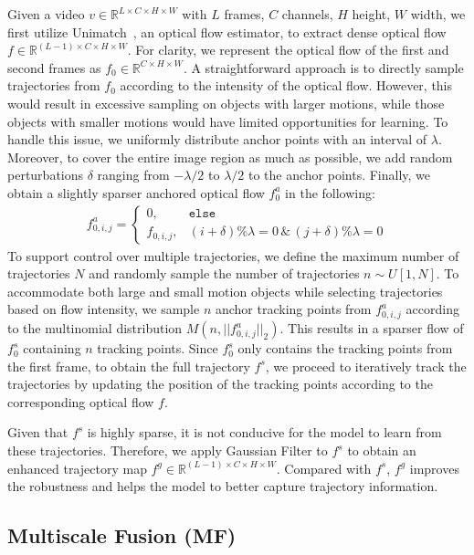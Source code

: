 \documentclass{article} %
\begin{document}
Given a video $v \in \mathbb{R}^{L\times C\times H\times W}$ with $L$ frames, $C$ channels, $H$ height, $W$ width,  we first utilize Unimatch~\citet{xu2023unifying}, an optical flow estimator, to extract dense optical flow $f \in \mathbb{R}^{(L-1)\times C\times H\times W}$. For clarity, we represent the optical flow of the first and second frames as $f_0 \in \mathbb{R}^{C\times H\times W}$. A straightforward approach is to directly sample trajectories from $f_0$ according to the intensity of the optical flow. However, this would result in excessive sampling on objects with larger motions, while those objects with smaller motions would have limited opportunities for learning. To handle this issue, we uniformly distribute anchor points with an interval of $\lambda$. Moreover, to cover the entire image region as much as possible, we add random perturbations $\delta$ ranging from $-\lambda/2$ to $\lambda/2$ to the anchor points. Finally, we obtain a slightly sparser anchored optical flow $f_0^a$ in the following:
\begin{align}\label{eq:fa}
    f_{0, i, j}^a = \begin{cases}
        0, & \texttt{else} \\
        f_{0, i, j}, & (i+\delta)\%\lambda=0 \, \texttt{\&} \, (j+\delta)\%\lambda=0
    \end{cases}
\end{align}
To support control over multiple trajectories, we define the maximum number of trajectories $N$ and randomly sample the number of trajectories $n\sim U[1, N]$. To accommodate both large and small motion objects while selecting trajectories based on flow intensity, we sample $n$ anchor tracking points from $f_{0,i,j}^{a}$ according to the multinomial distribution $M(n, ||f_{0,i,j}^{a}||_2)$. This results in a sparser flow of $f_0^s$ containing $n$ tracking points.
Since $f_0^s$ only contains the tracking points from the first frame, to obtain the full trajectory $f^s$, we proceed to iteratively track the trajectories by updating the position of the tracking points according to the corresponding optical flow $f$.

Given that $f^s$ is highly sparse, it is not conducive for the model to learn from these trajectories. Therefore, we apply Gaussian Filter to $f^s$ to obtain an enhanced trajectory map $f^g\in\mathbb{R}^{(L-1)\times C\times H \times W}$. Compared with  $f^s$, $f^g$ improves the robustness and helps the model to better capture trajectory information. 


\subsection{Multiscale Fusion (MF)}\label{sec:mf}
\end{document}
